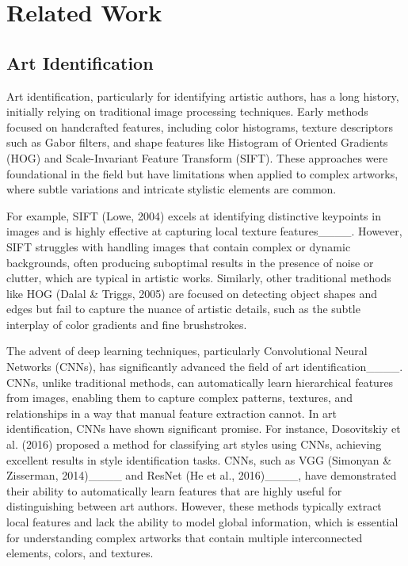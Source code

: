 \section{Related Work}
\subsection{Art Identification}

Art identification, particularly for identifying artistic authors, has a long history, initially relying on traditional image processing techniques. Early methods focused on handcrafted features, including color histograms, texture descriptors such as Gabor filters, and shape features like Histogram of Oriented Gradients (HOG) and Scale-Invariant Feature Transform (SIFT). These approaches were foundational in the field but have limitations when applied to complex artworks, where subtle variations and intricate stylistic elements are common.

For example, SIFT (Lowe, 2004) excels at identifying distinctive keypoints in images and is highly effective at capturing local texture features____. However, SIFT struggles with handling images that contain complex or dynamic backgrounds, often producing suboptimal results in the presence of noise or clutter, which are typical in artistic works. Similarly, other traditional methods like HOG (Dalal \& Triggs, 2005) are focused on detecting object shapes and edges but fail to capture the nuance of artistic details, such as the subtle interplay of color gradients and fine brushstrokes.

The advent of deep learning techniques, particularly Convolutional Neural Networks (CNNs), has significantly advanced the field of art identification____. CNNs, unlike traditional methods, can automatically learn hierarchical features from images, enabling them to capture complex patterns, textures, and relationships in a way that manual feature extraction cannot. In art identification, CNNs have shown significant promise. For instance, Dosovitskiy et al. (2016) proposed a method for classifying art styles using CNNs, achieving excellent results in style identification tasks. CNNs, such as VGG (Simonyan \& Zisserman, 2014)____ and ResNet (He et al., 2016)____, have demonstrated their ability to automatically learn features that are highly useful for distinguishing between art authors. However, these methods typically extract local features and lack the ability to model global information, which is essential for understanding complex artworks that contain multiple interconnected elements, colors, and textures.

